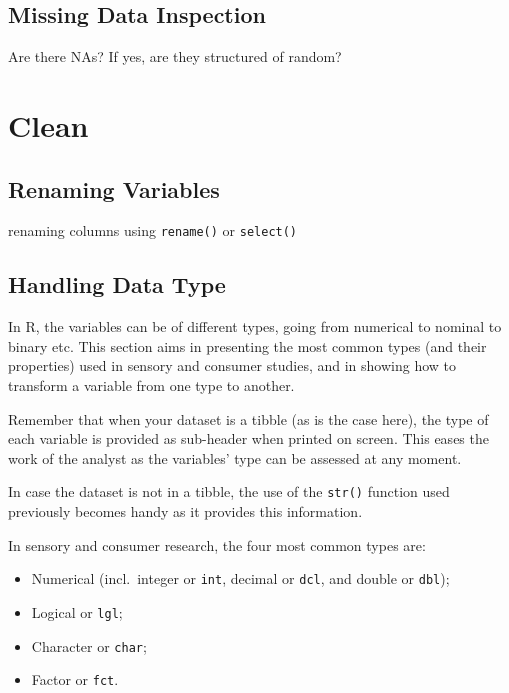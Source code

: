 \documentclass[
]{book}
\providecommand{\tightlist}{%
  \setlength{\itemsep}{0pt}\setlength{\parskip}{0pt}}
\begin{document}
\hypertarget{missing-data-inspection}{%
\subsection{Missing Data Inspection}\label{missing-data-inspection}}

Are there NAs?
If yes, are they structured of random?

\hypertarget{clean-1}{%
\section{Clean}\label{clean-1}}

\hypertarget{renaming-variables-1}{%
\subsection{Renaming Variables}\label{renaming-variables-1}}

renaming columns using \texttt{rename()} or \texttt{select()}

\hypertarget{handling-data-type}{%
\subsection{Handling Data Type}\label{handling-data-type}}

In R, the variables can be of different types, going from numerical to nominal to binary etc. This section aims in presenting the most common types (and their properties) used in sensory and consumer studies, and in showing how to transform a variable from one type to another.

Remember that when your dataset is a tibble (as is the case here), the type of each variable is provided as sub-header when printed on screen. This eases the work of the analyst as the variables' type can be assessed at any moment.

In case the dataset is not in a tibble, the use of the \texttt{str()} function used previously becomes handy as it provides this information.

In sensory and consumer research, the four most common types are:

\begin{itemize}
\tightlist
\item
  Numerical (incl.~integer or \texttt{int}, decimal or \texttt{dcl}, and double or \texttt{dbl});
\item
  Logical or \texttt{lgl};
\item
  Character or \texttt{char};
\item
  Factor or \texttt{fct}.
\end{itemize}
\end{document}
